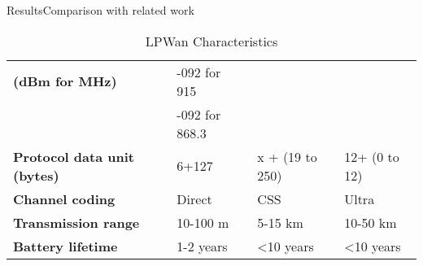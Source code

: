 \begin{frame}{Results}{Comparison with related work}
\begin{table}[h!]
\begin{center}
\begin{tabular}{l|l|l|l}
	\bf{\footnotesize{(dBm for MHz)}}              & -092 for 915   &                                 & \\
	\                                              & -092 for 868.3 &                                 & \\\hline
	\bf{Protocol data unit \footnotesize{(bytes)}} & 6+127          & x + (19 to 250)                 & 12+ (0 to 12)\\\hline
	\bf{Channel coding}                            & Direct         & CSS                             & Ultra        \\\hline
	\bf{Transmission range}                        & 10-100 m       & 5-15 km                         & 10-50 km     \\\hline
	\bf{Battery lifetime}                          & 1-2 years      & <10 years                       & <10 years    \\\hline

	\end{tabular}
	\caption{\label{tab:Table54975} LPWan Characteristics \cite{al-kashoash_comparison_2016}}
\end{center}
\end{table}

\end{frame}


